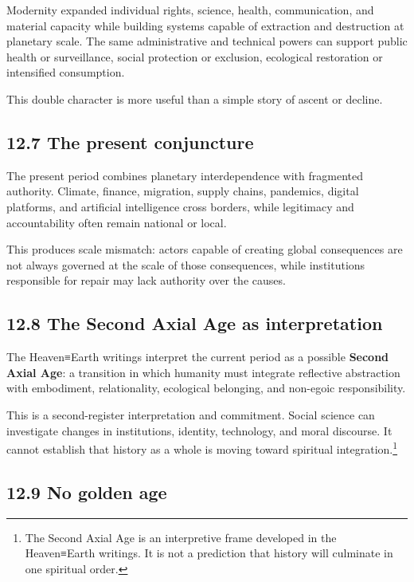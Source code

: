 \documentclass[
  11pt,
]{article}
\begin{document}
Modernity expanded individual rights, science, health, communication,
and material capacity while building systems capable of extraction and
destruction at planetary scale. The same administrative and technical
powers can support public health or surveillance, social protection or
exclusion, ecological restoration or intensified consumption.

This double character is more useful than a simple story of ascent or
decline.

\subsection{12.7 The present conjuncture}\label{the-present-conjuncture}

The present period combines planetary interdependence with fragmented
authority. Climate, finance, migration, supply chains, pandemics,
digital platforms, and artificial intelligence cross borders, while
legitimacy and accountability often remain national or local.

This produces scale mismatch: actors capable of creating global
consequences are not always governed at the scale of those consequences,
while institutions responsible for repair may lack authority over the
causes.

\subsection{12.8 The Second Axial Age as
interpretation}\label{the-second-axial-age-as-interpretation}

The Heaven≡Earth writings interpret the current period as a possible
\textbf{Second Axial Age}: a transition in which humanity must integrate
reflective abstraction with embodiment, relationality, ecological
belonging, and non-egoic responsibility.

This is a second-register interpretation and commitment. Social science
can investigate changes in institutions, identity, technology, and moral
discourse. It cannot establish that history as a whole is moving toward
spiritual integration.\footnote{The Second Axial Age is an interpretive
  frame developed in the Heaven≡Earth writings. It is not a prediction
  that history will culminate in one spiritual order.}

\subsection{12.9 No golden age}\label{no-golden-age}
\end{document}
